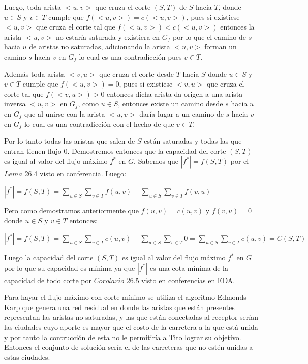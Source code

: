 \documentclass[runningheads,a4paper]{llncs}
\begin{document}
{\begin{itemize}
		Luego, toda arista $< u,v >$ que cruza el corte $(S,T)$ de $S$ hacia $T$, donde $u \in S$ y $v \in T$ cumple que $f(< u,v >) = c(< u,v >)$, pues si existiese $< u,v >$ que cruza el corte tal que $f(< u,v >) < c(< u,v >)$ entonces la arista $< u,v >$ no estar\'ia saturada y existiera en $G_f$ por lo que el camino de $s$ hacia $u$ de aristas no saturadas, adicionando la arista $< u,v >$ forman un camino $s$ hacia $v$ en $G_f$ lo cual es una contradicci\'on pues $v \in T$. 
		
		Adem\'as toda arista $< v,u >$ que cruza el corte desde $T$ hacia $S$ donde $u \in S$ y $v \in T$ cumple que $f(< u,v >) = 0$, pues si existiese $< v,u >$ que cruza el corte tal que $f(< v,u >) > 0$ entonces dicha arista da origen a una arista inversa $< u,v >$ en $G_f$, como $u \in S$, entonces existe un camino desde $s$ hacia $u$ en $G_f$ que al unirse con la arista $< u,v >$ dar\'ia lugar a un camino de $s$ hacia $v$ en $G_f$ lo cual es una contradicci\'on con el hecho de que $v \in T$.
		
		Por lo tanto todas las aristas que salen de $S$ est\'an saturadas y todas las que entran tienen flujo 0. Demostremos entonces que la capacidad del corte $(S,T)$ es igual al valor del flujo m\'aximo $f^*$ en $G$. Sabemos que $|f^*| = f(S,T)$ por el $Lema$ 26.4 visto en conferencia. Luego: 
		
		$|f^*| = f(S,T) = \sum\limits_{u\in S}\sum\limits_{v\in T}f(u,v)-\sum\limits_{u\in S}\sum\limits_{v\in T}f(v,u)$ 
		
		Pero como demostramos anteriormente que $f(u,v)=c(u,v)$ y $f(v,u)=0$ donde $u \in S$ y $v \in T$ entonces:
		
		$|f^*| = f(S,T) = \sum\limits_{u\in S}\sum\limits_{v\in T}c(u,v)-\sum\limits_{u\in S}\sum\limits_{v\in T}0 = \sum\limits_{u\in S}\sum\limits_{v\in T}c(u,v) = C(S,T)$
		
		Luego la capacidad del corte $(S,T)$ es igual al valor del flujo m\'aximo $f^*$ en $G$ por lo que su capacidad es m\'inima ya que $|f^*|$ es una cota m\'inima de la capacidad de todo corte por $Corolario$ 26.5 visto en conferencias en EDA.  
	\end{itemize}   
	
Para hayar el flujo m\'aximo con corte m\'inimo se utiliza el algoritmo Edmonds-Karp que genera una red residual en donde las aristas que est\'an presentes representan las aristas no saturadas, y las que est\'an conectadas al receptor ser\'ian las ciudades cuyo aporte es mayor que el costo de la carretera a la que est\'a unida y por tanto la contrucci\'on de esta no le permitir\'ia a Tito lograr su objetivo. Entonces el conjunto de soluci\'on ser\'ia el de las carreteras que no est\'en unidas a estas ciudades.\\

}
\end{document}
